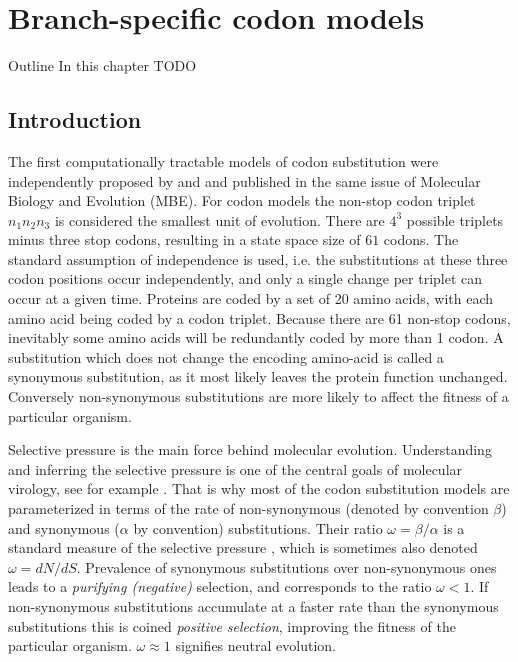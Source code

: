 \chapter{Branch-specific codon models\label{chap:dpp}}

\begin{remark}{Outline}
In this chapter
TODO
\end{remark}

\section{Introduction}

The first computationally tractable models of codon substitution were independently proposed by \cite{Muse1994} and \cite{Goldman1994} and published in the same issue of Molecular Biology and Evolution (MBE).
For codon models the non-stop codon triplet $n_{1}n_{2}n_{3}$ is considered the smallest unit of evolution.
There are $4^3$ possible triplets minus three stop codons, resulting in a state space size of $61$ codons.
The standard assumption of independence is used, i.e. the substitutions at these three codon positions occur independently, and only a single change per triplet can occur at a given time. 
Proteins are coded by a set of 20 amino acids, with each amino acid being coded by a codon triplet. 
Because there are 61 non-stop codons, inevitably some amino acids will be redundantly coded by more than 1 codon.
A substitution which does not change the encoding amino-acid is called a synonymous substitution, as it most likely leaves the protein function unchanged.
Conversely non-synonymous substitutions are more likely to affect the fitness of a particular organism.

Selective pressure is the main force behind molecular evolution.
Understanding and inferring the selective pressure is one of the central goals of molecular virology, see for example \citet{Bielejec2014a}.
That is why most of the codon substitution models are parameterized in terms of the rate of non-synonymous (denoted by convention $\beta$) and synonymous ($\alpha$ by convention) substitutions.
Their ratio $\omega=\beta / \alpha$ is a standard measure of the selective pressure \citep{ThePhylogeneticHandbook}, which is sometimes also denoted $\omega = dN/dS$.
Prevalence of synonymous substitutions over non-synonymous ones leads to a \emph{purifying (negative)} selection, and corresponds to the ratio $\omega <1$.
If non-synonymous substitutions accumulate at a faster rate than the synonymous substitutions this is coined \emph{positive selection}, improving the fitness of the particular organism.
$\omega\approx 1$ signifies neutral evolution.

